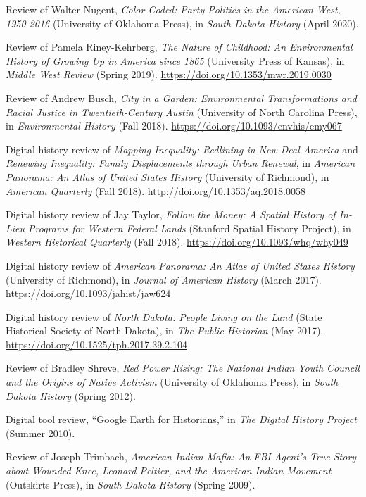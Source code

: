 Review of Walter Nugent, \emph{Color Coded: Party Politics in the
American West, 1950-2016} (University of Oklahoma Press), in \emph{South
Dakota History} (April 2020).

Review of Pamela Riney-Kehrberg, \emph{The Nature of Childhood: An
Environmental History of Growing Up in America since 1865} (University
Press of Kansas), in \emph{Middle West Review} (Spring 2019).
\url{https://doi.org/10.1353/mwr.2019.0030}

Review of Andrew Busch, \emph{City in a Garden: Environmental
Transformations and Racial Justice in Twentieth-Century Austin}
(University of North Carolina Press), in \emph{Environmental History}
(Fall 2018). \url{https://doi.org/10.1093/envhis/emy067}

Digital history review of \emph{Mapping Inequality: Redlining in New
Deal America} and \emph{Renewing Inequality: Family Displacements
through Urban Renewal}, in \emph{American Panorama: An Atlas of United
States History} (University of Richmond), in \emph{American Quarterly}
(Fall 2018). \url{http://doi.org/10.1353/aq.2018.0058}

Digital history review of Jay Taylor, \emph{Follow the Money: A Spatial
History of In-Lieu Programs for Western Federal Lands} (Stanford Spatial
History Project), in \emph{Western Historical Quarterly} (Fall 2018).
\url{https://doi.org/10.1093/whq/why049}

Digital history review of \emph{American Panorama: An Atlas of United
States History} (University of Richmond), in \emph{Journal of American
History} (March 2017). \url{https://doi.org/10.1093/jahist/jaw624}

Digital history review of \emph{North Dakota: People Living on the Land}
(State Historical Society of North Dakota), in \emph{The Public
Historian} (May 2017). \url{https://doi.org/10.1525/tph.2017.39.2.104}

Review of Bradley Shreve, \emph{Red Power Rising: The National Indian
Youth Council and the Origins of Native Activism} (University of
Oklahoma Press), in \emph{South Dakota History} (Spring 2012).

Digital tool review, ``Google Earth for Historians,'' in
\emph{\href{http://digitalhistory.unl.edu/t-reviews/geheppler.php}{The
Digital History Project}} (Summer 2010).

Review of Joseph Trimbach, \emph{American Indian Mafia: An FBI Agent's
True Story about Wounded Knee, Leonard Peltier, and the American Indian
Movement} (Outskirts Press), in \emph{South Dakota History} (Spring
2009).

